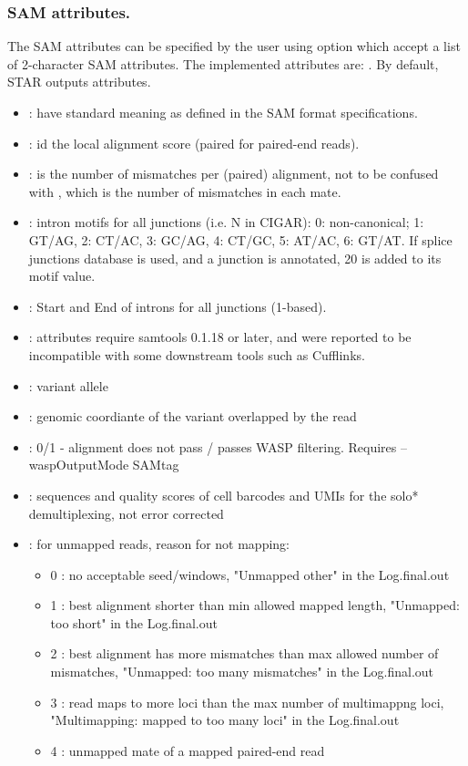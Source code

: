 \documentclass[12pt]{article}
\begin{document}
\subsubsection{SAM attributes.}
The SAM attributes can be specified by the user using   option which accept a list of 2-character SAM attributes. The implemented attributes are: . By default, STAR outputs  attributes.
\begin{itemize}
\item[]
 : have standard meaning as defined in the SAM format specifications.
\item[]
 : id the local alignment score (paired for paired-end reads). 
\item[]
 : is the number of mismatches per (paired) alignment, not to be confused with , which is the number of mismatches in each mate.
\item[]
 : intron motifs for all junctions (i.e. N in CIGAR): 0: non-canonical; 1: GT/AG, 2: CT/AC, 3: GC/AG, 4: CT/GC, 5: AT/AC, 6: GT/AT. If splice junctions database is used, and a junction is annotated, 20 is added to its motif value.
\item[]
 : Start and End of introns for all junctions (1-based).
\item[]
 : attributes require samtools 0.1.18 or later, and were reported to be incompatible with some downstream tools such as Cufflinks.
\item[]
 : variant allele
\item[]
 : genomic coordiante of the variant overlapped by the read
\item[]
 : 0/1 - alignment does not pass / passes WASP filtering. Requires --waspOutputMode SAMtag
\item[]
 : sequences and quality scores of cell barcodes and UMIs for the solo* demultiplexing, not error corrected
\item[]
 : for unmapped reads, reason for not mapping:
           \begin{itemize}[noitemsep,topsep=-3pt]
           	\item[] 0 : no acceptable seed/windows, "Unmapped other" in the Log.final.out
           	\item[] 1 : best alignment shorter than min allowed mapped length, "Unmapped: too short" in the Log.final.out
           	\item[] 2 : best alignment has more mismatches than max allowed number of mismatches, "Unmapped: too many mismatches" in the Log.final.out
			\item[] 3 : read maps to more loci than the max number of multimappng loci, "Multimapping: mapped to too many loci" in the Log.final.out
		    \item[] 4 : unmapped mate of a mapped paired-end read
           \end{itemize}

\end{itemize}
\end{document}
